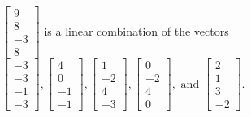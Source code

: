\begin{exercise}
\begin{exerciseStatement}
  \end{exerciseStatement}
  \begin{exerciseAnswer}
   \(\left[\begin{array}{c}
9 \\
8 \\
-3 \\
8
\end{array}\right]\) 
  	 is  
	a linear combination of the vectors \(\left[\begin{array}{c}
-3 \\
-3 \\
-1 \\
-3
\end{array}\right] , \left[\begin{array}{c}
4 \\
0 \\
-1 \\
-1
\end{array}\right] , \left[\begin{array}{c}
1 \\
-2 \\
4 \\
-3
\end{array}\right] , \left[\begin{array}{c}
0 \\
-2 \\
4 \\
0
\end{array}\right] , \text{ and } \left[\begin{array}{c}
2 \\
1 \\
3 \\
-2
\end{array}\right]\).

	
  


  \end{exerciseAnswer}
\end{exercise}